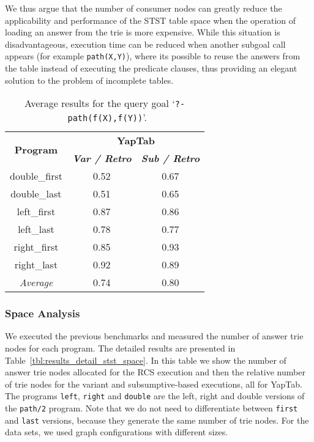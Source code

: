 We thus argue that the number of consumer nodes can greatly reduce the
applicability and performance of the STST table space when the operation of loading an answer
from the trie is more expensive. While this situation is disadvantageous, execution time can
be reduced when another subgoal call appears (for example \texttt{path(X,Y)}), where its possible to
reuse the answers from the table instead of executing the predicate clauses, thus providing an
elegant solution to the problem of incomplete tables.

\begin{table}[ht]
\centering
  \begin{tabular}{ccc}
   \hline
    \hline
    \multirow{2}{*}{\textbf{Program}} & \multicolumn{2}{c}{\textbf{YapTab}} \\
    & \textbf{\textit{\small{Var / Retro}}} & \textbf{\textit{\small{Sub / Retro}}} \\
   \hline
   \hline
double\_first & 0.52 & 0.67 \\
double\_last & 0.51 & 0.65 \\
left\_first & 0.87 & 0.86 \\
left\_last & 0.78 & 0.77 \\
right\_first & 0.85 & 0.93 \\
right\_last & 0.92 & 0.89 \\
\hline
\hline
\textit{Average} & 0.74 &  0.80 \\
\hline
\hline
\end{tabular}
\caption{Average results for the query goal `\texttt{?-~path(f(X),f(Y))}'.}
\label{tbl:results_average_stst}
\end{table}



\subsubsection{Space Analysis}

We executed the previous benchmarks and measured the number of answer trie nodes for each program.
The detailed results are presented in Table~\ref{tbl:results_detail_stst_space}. In this table
we show the number of answer trie nodes allocated for the RCS execution and then the relative number
of trie nodes for the variant and subsumptive-based executions, all for YapTab.
The programs \texttt{left}, \texttt{right} and \texttt{double} are the left, right and double versions
of the \texttt{path/2} program. Note that we do not need to differentiate between \texttt{first} and
\texttt{last} versions, because they generate the same number of trie nodes. For the data sets, we used
graph configurations with different sizes.

